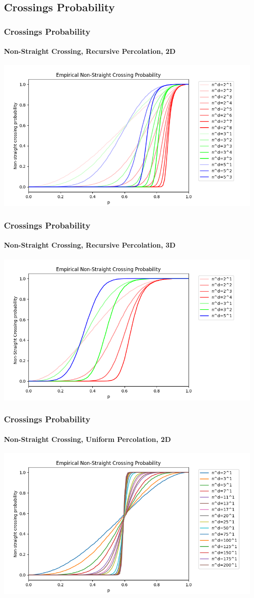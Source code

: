 \documentclass{beamer}
\begin{document}
	\subsection{Crossings Probability}
	\begin{frame}
		\frametitle{Crossings Probability}
		\framesubtitle{Non-Straight Crossing, Recursive Percolation, 2D}
		\begin{center}
			\includegraphics[scale=0.5]{imgs/crossing_proba_2D.png}
		\end{center}
	\end{frame}
	\begin{frame}
		\frametitle{Crossings Probability}
		\framesubtitle{Non-Straight Crossing, Recursive Percolation, 3D}
		\includegraphics[scale=0.5]{imgs/crossing_proba_3D.png}
	\end{frame}
	\begin{frame}
		\frametitle{Crossings Probability}
		\framesubtitle{Non-Straight Crossing, Uniform Percolation, 2D}
		\includegraphics[scale=0.5]{imgs/crossing_proba_2D_ter.png}
	\end{frame}
\end{document}
